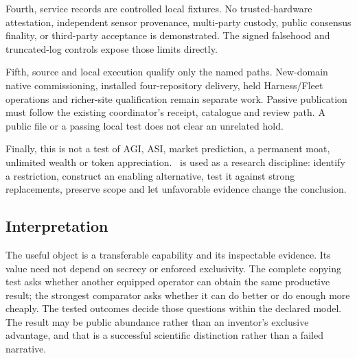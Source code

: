 Fourth, service records are controlled local fixtures. No trusted-hardware attestation, independent sensor provenance, multi-party custody, public consensus finality, or third-party acceptance is demonstrated. The signed falsehood and truncated-log controls expose those limits directly.

Fifth, source and local execution qualify only the named paths. New-domain native commissioning, installed four-repository delivery, held Harness/Fleet operations and richer-site qualification remain separate work. Passive publication must follow the existing coordinator's receipt, catalogue and review path. A public file or a passing local test does not clear an unrelated hold.

Finally, this is not a test of AGI, ASI, market prediction, a permanent moat, unlimited wealth or token appreciation. \TI\ is used as a research discipline: identify a restriction, construct an enabling alternative, test it against strong replacements, preserve scope and let unfavorable evidence change the conclusion.

\subsection{Interpretation}
The useful object is a transferable capability and its inspectable evidence. Its value need not depend on secrecy or enforced exclusivity. The complete copying test asks whether another equipped operator can obtain the same productive result; the strongest comparator asks whether it can do better or do enough more cheaply. The tested outcomes decide those questions within the declared model. The result may be public abundance rather than an inventor's exclusive advantage, and that is a successful scientific distinction rather than a failed narrative.
